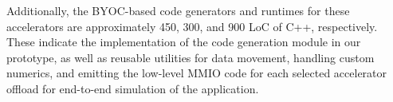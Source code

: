Additionally, the BYOC-based code generators and runtimes for these accelerators are approximately 450, 300, and 900 LoC of C++, %
respectively. 
These indicate the implementation of the code generation module in our prototype, as well as reusable utilities for data movement, handling custom numerics, and emitting the low-level MMIO code for each selected accelerator offload for end-to-end simulation of the application.

\iffalse
Note that simulating the SystemC HLS models requires extra effort and is less efficient compared to using ILAng.
First, the ILA matches the MMIO interface while the SystemC model requires a custom driver. 
Second, the ILA model targets 
  the highest (architecture) level of abstraction,
  whereas general SystemC models may reflect low-level design details and are slower to simulate.
  \fi
%
%
